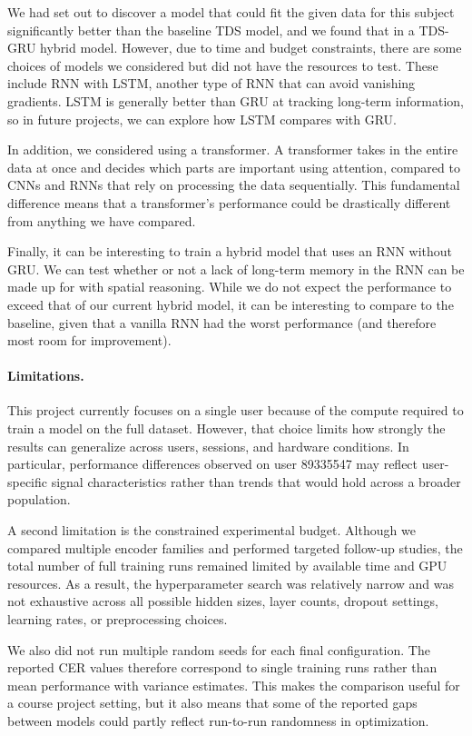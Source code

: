 \documentclass{article}
\begin{document}
We had set out to discover a model that could fit the given data for this subject significantly better than the baseline TDS model, and we found that in a TDS-GRU hybrid model. However, due to time and budget constraints, there are some choices of models we considered but did not have the resources to test. These include RNN with LSTM, another type of RNN that can avoid vanishing gradients. LSTM is generally better than GRU at tracking long-term information, so in future projects, we can explore how LSTM compares with GRU\@.

In addition, we considered using a transformer. A transformer takes in the entire data at once and decides which parts are important using attention, compared to CNNs and RNNs that rely on processing the data sequentially. This fundamental difference means that a transformer's performance could be drastically different from anything we have compared.

Finally, it can be interesting to train a hybrid model that uses an RNN without GRU\@. We can test whether or not a lack of long-term memory in the RNN can be made up for with spatial reasoning. While we do not expect the performance to exceed that of our current hybrid model, it can be interesting to compare to the baseline, given that a vanilla RNN had the worst performance (and therefore most room for improvement).

\paragraph{Limitations.}

This project currently focuses on a single user because of the compute required to
train a model on the full dataset. However, that choice limits how
strongly the results can generalize across users, sessions, and hardware
conditions. In particular, performance differences observed on user 89335547 may
reflect user-specific signal characteristics rather than trends that would hold
across a broader population.

A second limitation is the constrained experimental budget. Although we compared
multiple encoder families and performed targeted follow-up studies, the total
number of full training runs remained limited by available time and GPU
resources. As a result, the hyperparameter search was relatively narrow and was
not exhaustive across all possible hidden sizes, layer counts, dropout settings, learning
rates, or preprocessing choices.

We also did not run multiple random seeds for each final configuration. The
reported CER values therefore correspond to single training runs rather than
mean performance with variance estimates. This makes the comparison useful for a
course project setting, but it also means that some of the reported gaps between
models could partly reflect run-to-run randomness in optimization.
\end{document}
